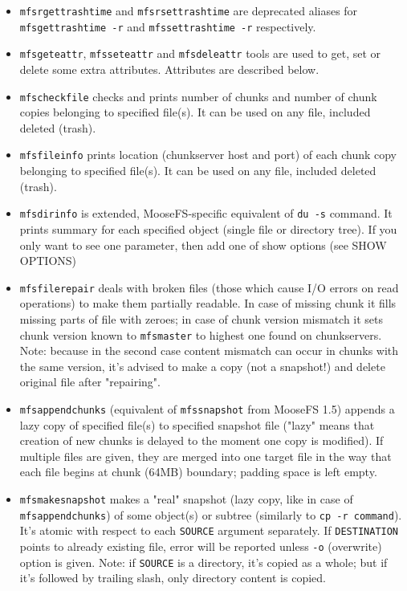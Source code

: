 \documentclass[a4paper,11pt,english]{report}
\def\code#1{\texttt{#1}}
\begin{document}
\begin{itemize}
					\item \code{mfsrgettrashtime} and  \code{mfsrsettrashtime} are deprecated aliases for \code{mfsgettrashtime -r} and \code{mfssettrashtime -r} respectively.

					\item \code{mfsgeteattr}, \code{mfsseteattr} and \code{mfsdeleattr} tools are used to get, set  or
					delete some extra attributes. Attributes are described below.

					\item \code{mfscheckfile}  checks  and  prints  number of chunks and number of chunk
					copies belonging to specified file(s).  It can be  used  on  any  file,
					included deleted (trash).

					\item \code{mfsfileinfo}  prints  location (chunkserver host and port) of each chunk
					copy belonging to specified file(s).  It  can  be  used  on  any  file,
					included deleted (trash).

					\item \code{mfsdirinfo}  is  extended, MooseFS-specific equivalent of \code{du -s} command.
					It prints summary for each specified object (single file  or  directory
					tree). If you only want to see one parameter, then add one of show options (see SHOW OPTIONS)

					\item \code{mfsfilerepair}  deals with broken files (those which cause I/O errors on
					read operations) to make them partially readable. In  case  of  missing
					chunk  it fills missing parts of file with zeroes; in case of chunk version
					mismatch it sets chunk version known to \code{mfsmaster} to  highest  one
					found  on  chunkservers.  Note: because in the second case content mismatch
					can occur in chunks with the same version, it's advised to make a
					copy (not a snapshot!)  and delete original file after "repairing".

					\item \code{mfsappendchunks}  (equivalent of \code{mfssnapshot} from MooseFS 1.5) appends a
					lazy copy of specified file(s) to specified snapshot file ("lazy" means
					that  creation of new chunks is delayed to the moment one copy is modified).
					If multiple files are given, they are merged  into  one  target
					file in the way that each file begins at chunk (64MB) boundary; padding
					space is left empty.

					\item \code{mfsmakesnapshot} makes a "real" snapshot (lazy copy, like  in  case  of
					\code{mfsappendchunks})  of some object(s) or subtree (similarly to \code{cp -r command}).
					It's atomic with respect to each \code{SOURCE} argument separately.  If
					\code{DESTINATION}  points  to  already  existing file, error will be reported
					unless \code{-o} (overwrite) option is given. Note: if \code{SOURCE} is a  directory,
					it's  copied  as  a whole; but if it's followed by trailing slash, only
					directory content is copied.


\end{itemize}
\end{document}
